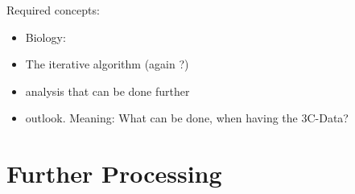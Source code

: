 %
%
%
%
%
%




Required concepts:
\begin{itemize}
    \item Biology:
    \item The iterative algorithm (again ?)
    \item analysis that can be done further
    \item outlook. Meaning: What can be done, when having the 3C-Data?
\end{itemize}



\section{Further Processing}\label{sec:furtherprocessing}





